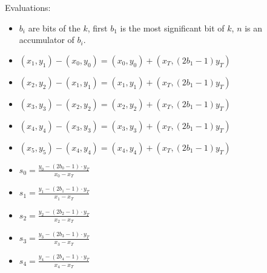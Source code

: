 Evaluations:
\begin{itemize}
	\item $b_i$ are bits of the $k$, first $b_1$ is the most significant bit of $k$, $n$ is an accumulator of $b_i$.
	\item $(x_1, y_1) - (x_0, y_0) = (x_0, y_0) + (x_T, (2b_1 - 1)y_T)$
	\item $(x_2, y_2) - (x_1, y_1) = (x_1, y_1) + (x_T, (2b_1 - 1)y_T)$
	\item $(x_3, y_3) - (x_2, y_2) = (x_2, y_2) + (x_T, (2b_1 - 1)y_T)$
	\item $(x_4, y_4) - (x_3, y_3) = (x_3, y_3) + (x_T, (2b_1 - 1)y_T)$
	\item $(x_5, y_5) - (x_4, y_4) = (x_4, y_4) + (x_T, (2b_1 - 1)y_T)$
	\item $s_0 = \frac{y_0 - (2b_0 - 1) \cdot y_T}{x_0 - x_T}$
	\item $s_1 = \frac{y_1 - (2b_1 - 1) \cdot y_T}{x_1 - x_T}$
	\item $s_2 = \frac{y_2 - (2b_2 - 1) \cdot y_T}{x_2 - x_T}$
	\item $s_3 = \frac{y_3 - (2b_3 - 1) \cdot y_T}{x_3 - x_T}$
	\item $s_4 = \frac{y_4 - (2b_4 - 1) \cdot y_T}{x_4 - x_T}$
\end{itemize}

